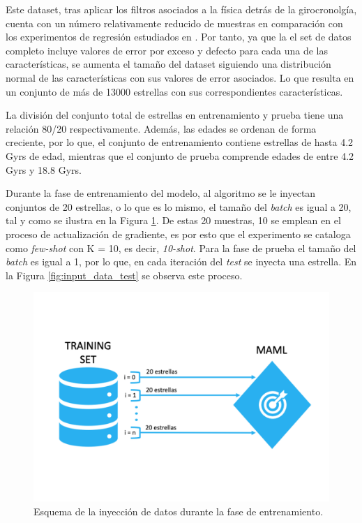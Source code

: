 Este dataset, tras aplicar los filtros asociados a la física detrás de la girocronolgía, cuenta con un número relativamente reducido de muestras en comparación con los experimentos de regresión estudiados en \cite{finn2017modelagnostic}. Por tanto, ya que la el set de datos completo incluye valores de error por exceso y defecto para cada una de las características, se aumenta el tamaño del dataset siguiendo una distribución normal de las características con sus valores de error asociados. Lo que resulta en un conjunto de más de 13000 estrellas con sus correspondientes características.

La división del conjunto total de estrellas en entrenamiento y prueba tiene una relación 80/20 respectivamente. Además, las edades se ordenan de forma creciente, por lo que, el conjunto de entrenamiento contiene estrellas de hasta 4.2 Gyrs de edad, mientras que el conjunto de prueba comprende edades de entre 4.2 Gyrs y 18.8 Gyrs.

Durante la fase de entrenamiento del modelo, al algoritmo se le inyectan conjuntos de 20 estrellas, o lo que es lo mismo, el tamaño del \emph{batch} es igual a 20, tal y como se ilustra en la Figura \ref{fig:input_data_train}. De estas 20 muestras, 10 se emplean en el proceso de actualización de gradiente, es por esto que el experimento se cataloga como \emph{few-shot} con K = 10, es decir, \emph{10-shot}. Para la fase de prueba el tamaño del \emph{batch} es igual a 1, por lo que, en cada iteración del \emph{test} se inyecta una estrella. En la Figura \ref{fig:input_data_test} se observa este proceso.

\begin{figure}[H]
\begin{center}
 \includegraphics[width=0.8\linewidth]{Figuras/MAML/train_data.pdf}
\end{center}
\caption{Esquema de la inyección de datos durante la fase de entrenamiento.}
 \label{fig:input_data_train}
\end{figure}

